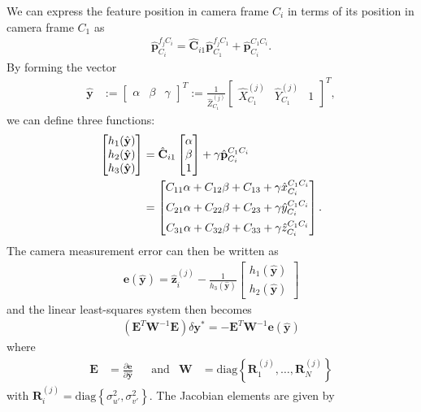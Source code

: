 \documentclass[letterpaper, 10 pt, conference]{ieeeconf}  %
\def\Vec#1{\mathbf{#1}}
\newcommand{\bbm}{\begin{bmatrix}}
\newcommand{\ebm}{\end{bmatrix}}
\begin{document}
We can express the feature position in camera frame $C_i$ in terms of its position in camera frame $C_1$ as
\begin{align}
\hat{\Vec{p}}_{C_i}^{f_j C_i} = \hat{\Vec{C}}_{i1} \hat{\Vec{p}}_{C_1}^{f_j C_1}  + \hat{\Vec{p}}_{C_i}^{C_1 C_i} .
\end{align}
By forming the vector
\begin{align}
\hat{\Vec{y}} &:= \bbm \alpha & \beta & \gamma \ebm^T := \frac{1}{\hat{Z}^{(j)}_{C_1}} \bbm \hat{X}^{(j)}_{C_1} & \hat{Y}^{(j)}_{C_1} & 1 \ebm ^T ,
\end{align}
we can define three functions:
\begin{align}
    \bbm h_1 (\hat{\Vec{y}}) \\ h_2 (\hat{\Vec{y}}) \\ h_3 (\hat{\Vec{y}}) \ebm 
    & = \hat{\Vec{C}}_{i1} \bbm \alpha \\ \beta \\ 1 \ebm + \gamma  \hat{\Vec{p}}_{C_i}^{C_1 C_i} \notag \\
    & = \bbm C_{11} \alpha + C_{12} \beta + C_{13} + \gamma \hat{x}_{C_i}^{C_1 C_i} \\[0.5em]
            C_{21} \alpha + C_{22} \beta + C_{23} + \gamma \hat{y}_{C_i}^{C_1 C_i} \\[0.5em]
            C_{31} \alpha + C_{32} \beta + C_{33} + \gamma \hat{z}_{C_i}^{C_1 C_i} 
        \ebm .
\end{align}
The camera measurement error can then be written as
\begin{align}
\Vec e(\hat{\Vec{y}}) = \hat{\Vec{z}}_i^{(j)} - \frac{1}{h_3 (\hat{\Vec{y}}) } \bbm h_1 (\hat{\Vec{y}}) \\ h_2 (\hat{\Vec{y}}) \ebm
\end{align}
and the linear least-squares system then becomes
\begin{align}
(\Vec  E^T \Vec W ^{-1} \Vec E ) \delta \Vec{y}^*  = - \Vec{E}^T\Vec{W}^{-1}\Vec{e}(\hat{\Vec{y}})
\end{align}
where
\begin{align}
\Vec E &= \frac{\partial \Vec e}{\partial \hat{\Vec{y}}}
& &
\text{and}
&
\Vec W &= \text{diag}\left\{ \Vec{R}_1^{(j)}, \hdots, \Vec{R}_N^{(j)} \right\}
\end{align}
with $\Vec{R}_i^{(j)} = \text{diag}\left\{\sigma^2_{u'}, \sigma^2_{v'}\right\}$.
The Jacobian elements are given by
\end{document}
